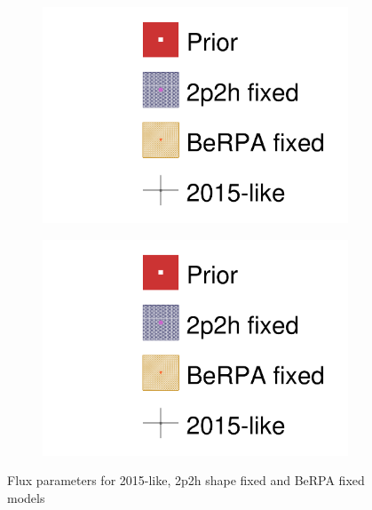\begin{figure}[h]
\begin{subfigure}[t]{0.24\textwidth}
			\includegraphics[width=\textwidth, trim={0mm 0mm 0mm 0mm}, clip,page=8]{figures/mach3/data/alt/2017b_NewData_NewDet_hpc_2p2hshapeFix_0_2017b_NewData_NewDet_hpc_BeRPAfix_0_2017b_NewData_NewDet_hpc_2015like_0.pdf}
		\end{subfigure}
		\begin{subfigure}[t]{0.24\textwidth}
			\includegraphics[width=\textwidth, trim={0mm 0mm 0mm 0mm}, clip,page=9]{figures/mach3/data/alt/2017b_NewData_NewDet_hpc_2p2hshapeFix_0_2017b_NewData_NewDet_hpc_BeRPAfix_0_2017b_NewData_NewDet_hpc_2015like_0.pdf}
		\end{subfigure}
	\caption{Flux parameters for 2015-like, 2p2h shape fixed and BeRPA fixed models}
	\label{fig:2015like_berpa_2p2h_comp_flux}
\end{figure}

